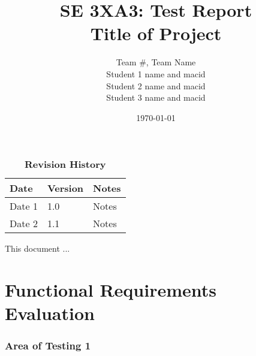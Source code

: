 \documentclass[12pt, titlepage]{article}
\title{SE 3XA3: Test Report\\Title of Project}
\author{Team \#, Team Name
		\\ Student 1 name and macid
		\\ Student 2 name and macid
		\\ Student 3 name and macid
}
\date{\today}
\begin{document}
\maketitle
{}
\tableofcontents
\listoftables
\listoffigures
\begin{table}[bp]
\caption{\bf Revision History}
\begin{tabularx}{\textwidth}{p{3cm}p{2cm}X}
\toprule {\bf Date} & {\bf Version} & {\bf Notes}\\
\midrule
Date 1 & 1.0 & Notes\\
Date 2 & 1.1 & Notes\\
\bottomrule
\end{tabularx}
\end{table}
\newpage
{}
This document ...

\section{Functional Requirements Evaluation}

\subsubsection{Area of Testing 1}		
	\label{sec:3.1.1}
\end{document}

